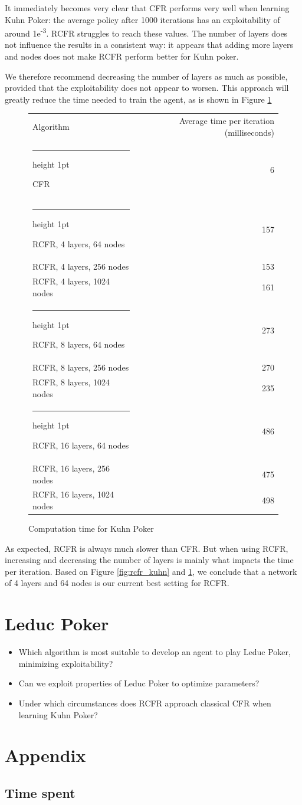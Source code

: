 \documentclass[10pt,a4paper]{article}
\makeatletter
\newcommand{\thickhline}{%
    \noalign {\ifnum 0=`}\fi \hrule height 1pt
    \futurelet \reserved@a \@xhline
}
\makeatother
\begin{document}
It immediately becomes very clear that CFR performs very well when learning Kuhn Poker: the average policy after 1000 iterations has an exploitability of around 1e\textsuperscript{-3}. RCFR struggles to reach these values. The number of layers does not influence the results in a consistent way: it appears that adding more layers and nodes does not make RCFR perform better for Kuhn poker. 

We therefore recommend decreasing the number of layers as much as possible, provided that the exploitability does not appear to worsen. This approach will greatly reduce the time needed to train the agent, as is shown in Figure \ref{tbl:kuhn_times}

\begin{figure}
\centering
\begin{tabular}{|l|r|}
\hline
Algorithm & Average time per iteration (milliseconds)\\
\thickhline
CFR & 6 \\
\thickhline
RCFR, 4 layers, 64 nodes& 157 \\
\hline
RCFR, 4 layers, 256 nodes & 153 \\
\hline
RCFR, 4 layers, 1024 nodes & 161 \\
\thickhline
RCFR, 8 layers, 64 nodes & 273 \\
\hline
RCFR, 8 layers, 256 nodes  & 270 \\
\hline
RCFR, 8 layers, 1024 nodes  & 235 \\
\thickhline
RCFR, 16 layers, 64 nodes & 486 \\
\hline
RCFR, 16 layers, 256 nodes & 475 \\
\hline
RCFR, 16 layers, 1024 nodes & 498 \\
\hline
\end{tabular}
\caption{Computation time for Kuhn Poker}
\label{tbl:kuhn_times}
\end{figure}

As expected, RCFR is always much slower than CFR. But when using RCFR, increasing and decreasing the number of layers is mainly what impacts the time per iteration. Based on Figure \ref{fig:rcfr_kuhn} and \ref{tbl:kuhn_times}, we conclude that a network of 4 layers and 64 nodes is our current best setting for RCFR.


 


\section{Leduc Poker}
\begin{tcolorbox}
\begin{itemize}
\item{Which algorithm is most suitable to develop an agent to play Leduc Poker, minimizing exploitability?}
\item{Can we exploit properties of Leduc Poker to optimize parameters?}
\item{Under which circumstances does RCFR approach classical CFR when learning Kuhn Poker?}
\end{itemize}
\end{tcolorbox}




\section*{Appendix}
\subsection{Time spent}
\end{document}
